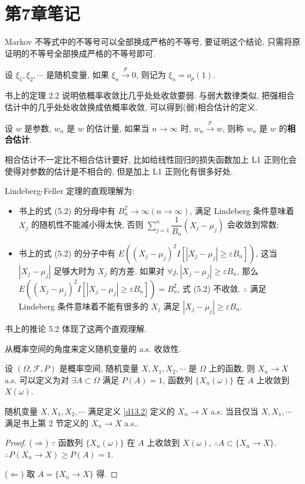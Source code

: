 \documentclass[color=black,device=normal,lang=cn]{elegantnote}
\numberwithin{equation}{section}
\theoremstyle{plain}
\numberwithin{exercise}{exsection}
\begin{document}
\section{第7章笔记}
Markov 不等式中的不等号可以全部换成严格的不等号, 要证明这个结论, 只需将原证明的不等号全部换成严格的不等号即可.

设 $\xi_1,\xi_2,\cdots$ 是随机变量, 如果 $\xi_n\xrightarrow{p}0$, 则记为 $\xi_n=o_p(1)$.

书上的定理 2.2 说明依概率收敛比几乎处处收敛要弱. 与弱大数律类似, 把强相合估计中的几乎处处收敛换成依概率收敛, 可以得到(弱)相合估计的定义.
\begin{definition}
    设 $w$ 是参数, $w_n$ 是 $w$ 的估计量, 如果当 $n\to\infty$ 时, $w_n\xrightarrow{p}w$, 则称 $w_n$ 是 $w$ 的\textbf{相合估计}.
\end{definition}

相合估计不一定比不相合估计要好, 比如给线性回归的损失函数加上 L1 正则化会使得对参数的估计是不相合的, 但是加上 L1 正则化有很多好处.

Lindeberg-Feller 定理的直观理解为:
\begin{itemize}
    \item 书上的式 (5.2) 的分母中有 $B_n^2\to\infty(n\to\infty)$, 满足 Lindeberg 条件意味着 $X_j$ 的随机性不能减小得太快, 否则 $\sum\limits_{j=1}^n\dfrac{1}{B_n}(X_j-\mu_j)$ 会收敛到常数;
    \item 书上的式 (5.2) 的分子中有 $E((X_j-\mu_j)^2I[|X_j-\mu_j|\geq\varepsilon B_n])$, 这当 $|X_j-\mu_j|$ 足够大时为 $X_j$ 的方差. 如果对 $\forall j,|X_j-\mu_j|\geq\varepsilon B_n$, 那么 $E((X_j-\mu_j)^2I[|X_j-\mu_j|\geq\varepsilon B_n])=B_n^2$, 式 (5.2) 不收敛. $\therefore$ 满足 Lindeberg 条件意味着不能有很多的 $X_j$ 满足 $|X_j-\mu_j|\geq\varepsilon B_n$.
\end{itemize}

书上的推论 5.2 体现了这两个直观理解.

从概率空间的角度来定义随机变量的 a.s. 收敛性.
\begin{definition}\label{d13.2}
    设 $(\Omega,\mathcal{F},P)$ 是概率空间, 随机变量 $X,X_1,X_2,\cdots$ 是 $\Omega$ 上的函数, 则 $X_n\to X$ a.s. 可以定义为对 $\exists A\subset\Omega$ 满足 $P(A)=1$, 函数列 $\{X_n(\omega)\}$ 在 $A$ 上收敛到 $X(\omega)$.
\end{definition}
\begin{theorem}
    随机变量 $X,X_1,X_2,\cdots$ 满足定义 \ref{d13.2} 定义的 $X_n\to X$ a.s. 当且仅当 $X,X_1,\cdots$ 满足书上第 2 节定义的 $X_n\to X$ a.s..
\end{theorem}
\begin{proof}
    ($\Rightarrow$) $\because$ 函数列 $\{X_n(\omega)\}$ 在 $A$ 上收敛到 $X(\omega)$, $\therefore A\subset\{X_n\to X\}$. $\therefore P(X_n\to X)\geq P(A)=1$.

    ($\Leftarrow$) 取 $A=\{X_n\to X\}$ 得.
\end{proof}
\end{document}

